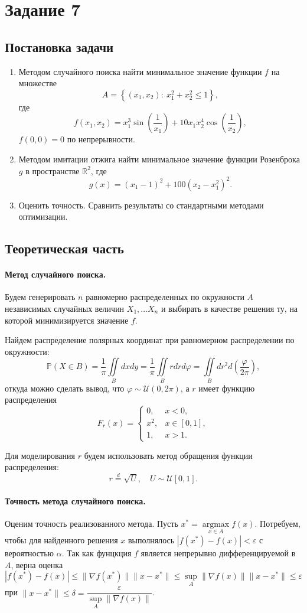\documentclass[16pt]{article}
\begin{document}
\section{Задание 7}
\subsection{Постановка задачи}
\begin{enumerate}
	\item Методом случайного поиска найти минимальное значение функции $f$ на множестве $$A = \left\{(x_1, x_2)\colon \ x_1^2 + x_2^2 \leq 1\right\},$$ где 
 $$f(x_1, x_2) = x_1^3\sin\left(\dfrac{1}{x_1}\right) + 10x_1x_2^4 \cos\left(\dfrac{1}{x_2}\right),$$
 $f(0, 0) = 0$ по непрерывности.
	\item Методом имитации отжига найти минимальное значение функции Розенброка $g$ в пространстве $\mathbb{R}^2$, где
$$g(x) = (x_1 - 1)^2 + 100(x_2 - x_1^2)^2.$$
	\item Оценить точность. Сравнить результаты со стандартными методами оптимизации.
\end{enumerate}
\subsection{Теоретическая часть}
\paragraph{Метод случайного поиска.} Будем генерировать $n$ равномерно распределенных по окружности $A$ независимых случайных величин $X_1, \ldots X_n$ и выбирать в качестве решения ту, на которой минимизируется значение $f$.

Найдем распределение полярных координат при равномерном распределении по окружности:
$$\mathbb{P}(X \in B) = \dfrac{1}{\pi}\iint\limits_Bdxdy = \dfrac{1}{\pi}\iint\limits_Brdrd\varphi = \iint\limits_Bdr^2d\left(\dfrac{\varphi}{2\pi}\right),$$
откуда можно сделать вывод, что $\varphi \sim \mathcal{U}(0, 2\pi)$, а $r$ имеет функцию распределения
$$F_r(x) = 
\begin{cases}
0, &x < 0, \\
x^2, &x \in [0, 1], \\
1, &x > 1.
\end{cases}$$

Для моделирования $r$ будем использовать метод обращения функции распределения:
$$r \overset{d}{=} \sqrt{U}, \quad U \sim \mathcal{U}[0, 1].$$

\paragraph{Точность метода случайного поиска.}
Оценим точность реализованного метода. Пусть $x^* = \underset{x \in A}{\operatorname{argmax}}  f(x)$. Потребуем, чтобы для найденного решения $x$ выполнялось $|f(x^*) - f(x)| < \varepsilon$ с вероятностью $\alpha$. Так как фунцкция $f$ является непрерывно дифференцируемой в $A$, верна оценка
$$|f(x^*) - f(x)| \leq \|\nabla f(x^*)\| \|x - x^*\| \leq \sup_A \|\nabla f(x)\|\|x - x^*\| \leq \varepsilon$$
при $\|x - x^*\| \leq \delta = \dfrac{\varepsilon}{\sup\limits_A \|\nabla f(x)\|}$.
\end{document}
